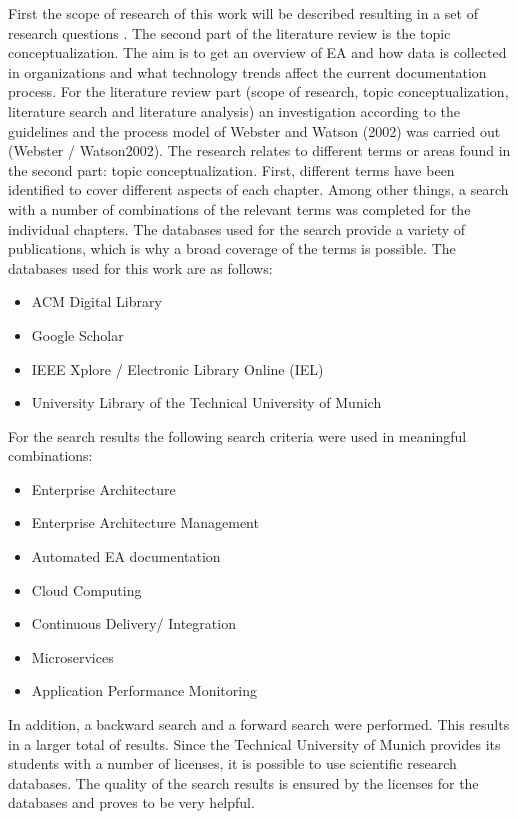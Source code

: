 First the scope of research of this work will be described resulting in a set of research questions . The second part of the literature review is the topic conceptualization. The aim is to get an overview of EA and how data is collected in organizations and what technology trends affect the current documentation process. 
For the literature review part (scope of research, topic conceptualization, literature search and literature analysis)  an investigation according to the guidelines and the process model of Webster and Watson (2002) was carried out (Webster / Watson2002). The research relates to different terms or areas found in the second part: topic conceptualization. First, different terms have been identified to cover different aspects of each chapter. Among other things, a search with a number of combinations of the relevant terms was completed for the individual chapters.
The databases used for the search provide a variety of publications, which is why a broad coverage of the terms is possible. The databases used for this work are as follows:

\begin{itemize}
    \item ACM Digital Library
    \item Google Scholar
    \item IEEE Xplore / Electronic Library Online (IEL)
    \item University Library of the Technical University of Munich
\end{itemize}

For the search results the following search criteria were used in meaningful combinations:

\begin{itemize}
    \item Enterprise Architecture
    \item Enterprise Architecture Management
    \item Automated EA documentation
    \item Cloud Computing
    \item Continuous Delivery/ Integration
    \item Microservices
    \item Application Performance Monitoring
\end{itemize}

In addition, a backward search and a forward search were performed. This results in a larger total of results. Since the Technical University of Munich provides its students with a number of licenses, it is possible to use scientific research databases. The quality of the search results is ensured by the licenses for the databases and proves to be very helpful.

